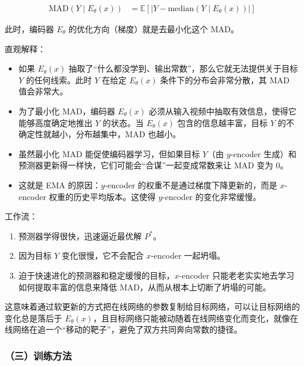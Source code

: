 \[
\begin{aligned}
\mathrm{MAD}(Y\mid E_\theta(x))
&=
\mathbb{E}
\left[
\left|
Y-\mathrm{median}(Y\mid E_\theta(x))
\right|
\right]
\end{aligned}
\]

此时，编码器 \(E_\theta\) 的优化方向（梯度）就是去最小化这个 MAD。

直观解释：

\begin{itemize}
\tightlist
\item
  如果 \(E_\theta(x)\) 抽取了``什么都没学到、输出常数''，那么它就无法提供关于目标 \(Y\) 的任何线索。此时 \(Y\) 在给定 \(E_\theta(x)\) 条件下的分布会非常分散，其 MAD 值会非常大。
\item
  为了最小化 MAD，编码器 \(E_\theta(x)\) 必须从输入视频中抽取有效信息，使得它能够高度确定地推出 \(Y\) 的状态。当 \(E_\theta(x)\) 包含的信息越丰富，目标 \(Y\) 的不确定性就越小，分布越集中，MAD 也越小。
\item
  虽然最小化 MAD 能促使编码器学习，但如果目标 \(Y\)（由 \(y\)-encoder 生成）和预测器更新得一样快，它们可能会``合谋''一起变成常数来让 MAD 变为 \(0\)。
\item
  这就是 EMA 的原因：\(y\)-encoder 的权重不是通过梯度下降更新的，而是 \(x\)-encoder 权重的历史平均版本。这使得 \(y\)-encoder 的变化非常缓慢。
\end{itemize}

工作流：

\begin{enumerate}
\def\labelenumi{\arabic{enumi}.}
\tightlist
\item
  预测器学得很快，迅速逼近最优解 \(P^{*}\)。
\item
  因为目标 \(Y\) 变化很慢，它不会配合 \(x\)-encoder 一起坍塌。
\item
  迫于快速进化的预测器和稳定缓慢的目标，\(x\)-encoder 只能老老实实地去学习如何提取丰富的信息来降低 MAD，从而从根本上切断了坍塌的可能。
\end{enumerate}

这意味着通过软更新的方式把在线网络的参数复制给目标网络，可以让目标网络的变化总是落后于 \(E_\theta(x)\)，且目标网络只能被动随着在线网络变化而变化，就像在线网络在追一个``移动的靶子''，避免了双方共同奔向常数的捷径。

\hypertarget{ux4e09ux8badux7ec3ux65b9ux6cd5-1}{%
\subsubsection{（三）训练方法}\label{ux4e09ux8badux7ec3ux65b9ux6cd5-1}}

